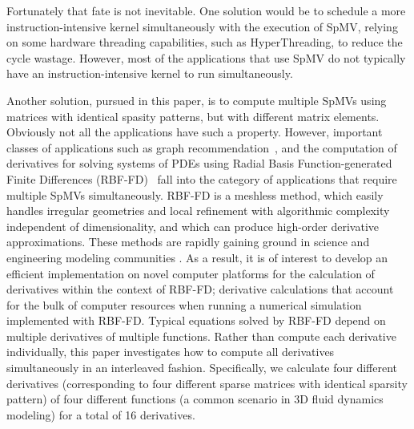 \documentclass{sig-alternate}
\def\NOTE#1{{}}
\def\ge#1{{#1}}
\begin{document}
Fortunately that fate is not inevitable. One solution would be to
schedule a more instruction-intensive kernel simultaneously with the
execution of SpMV, relying on some hardware threading capabilities,
such as HyperThreading, to reduce the cycle wastage. However, most of 
the applications that use SpMV do not typically have an 
instruction-intensive kernel to run simultaneously.

Another solution, pursued in this paper, \ge{is to compute multiple SpMVs using matrices with identical spasity patterns, but with different matrix elements.}  Obviously not all the applications have such a property. However, important classes of applications such as graph recommendation~\cite{Kucuktunc13-SNAM}, \NOTE{eigensolving does not match that description} and the computation of derivatives for solving systems of PDEs using Radial Basis Function-generated Finite Differences (RBF-FD)~\cite{FLBWSC12} \ge{fall into the category of applications that require multiple SpMVs simultaneously.} RBF-FD is a meshless method, which easily handles irregular geometries and local refinement with algorithmic complexity independent of dimensionality, 
and which can produce high-order derivative approximations. These methods are rapidly gaining 
ground in science and engineering modeling communities \cite{Bayona13,CDNT,FoL11,FLBWSC12,SPLM}. 
As a result, it is of interest to develop an efficient implementation on novel computer platforms for the calculation of derivatives within the context of RBF-FD; derivative calculations that account for the bulk of computer resources when running a numerical simulation implemented with RBF-FD. 
\ge{Typical equations solved by RBF-FD depend on multiple derivatives
of multiple functions. Rather than compute each derivative individually, this paper investigates 
how to compute all derivatives simultaneously in an interleaved fashion. Specifically, 
we calculate four different derivatives (corresponding to four different sparse matrices with identical 
sparsity pattern) of four different functions
(a common scenario in 3D fluid dynamics modeling) for a total of 16 derivatives. }
\end{document}
